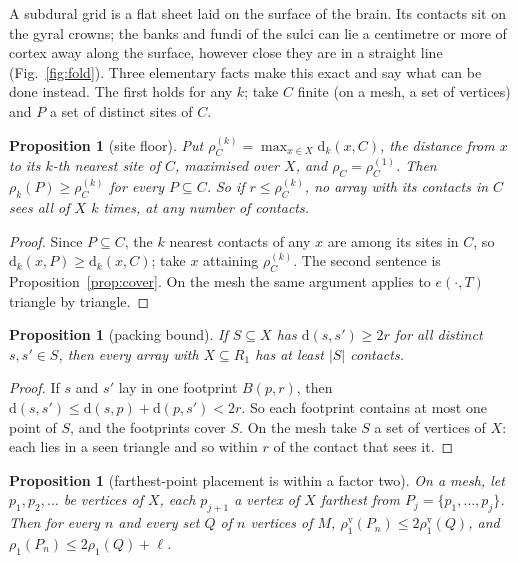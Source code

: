 \documentclass[11pt]{amsart}
\newtheorem{proposition}[theorem]{Proposition}
\theoremstyle{definition}
\theoremstyle{remark}
\newcommand{\dd}{\mathrm{d}}
\begin{document}
A subdural grid is a flat sheet laid on the surface of the brain. Its contacts
sit on the gyral crowns; the banks and fundi of the sulci can lie a centimetre
or more of cortex away along the surface, however close they are in a
straight line (Fig.~\ref{fig:fold}). Three elementary facts make this exact
and say what can be done instead. The first holds for any $k$; take $C$ finite
(on a mesh, a set of vertices) and $P$ a set of distinct sites of $C$.

\begin{proposition}[site floor]\label{prop:sitefloor}
Put $\rho_C^{(k)}=\max_{x\in X}\dd_k(x,C)$, the distance from $x$ to its $k$-th
nearest site of $C$, maximised over $X$, and $\rho_C=\rho_C^{(1)}$. Then
$\rho_k(P)\ge\rho_C^{(k)}$ for every $P\subseteq C$. So if $r\le\rho_C^{(k)}$,
no array with its contacts in $C$ sees all of $X$ $k$ times, at any number of
contacts.
\end{proposition}

\begin{proof}
Since $P\subseteq C$, the $k$ nearest contacts of any $x$ are among its sites
in $C$, so $\dd_k(x,P)\ge\dd_k(x,C)$; take $x$ attaining $\rho_C^{(k)}$. The
second sentence is Proposition~\ref{prop:cover}. On the mesh the same argument
applies to $e(\cdot,T)$ triangle by triangle.
\end{proof}

\begin{proposition}[packing bound]\label{prop:packing}
If $S\subseteq X$ has $\dd(s,s')\ge 2r$ for all distinct $s,s'\in S$, then
every array with $X\subseteq R_1$ has at least $|S|$ contacts.
\end{proposition}

\begin{proof}
If $s$ and $s'$ lay in one footprint $B(p,r)$, then $\dd(s,s')\le
\dd(s,p)+\dd(p,s')<2r$. So each footprint contains at most one point of $S$,
and the footprints cover $S$. On the mesh take $S$ a set of vertices of $X$:
each lies in a seen triangle and so within $r$ of the contact that sees it.
\end{proof}

\begin{proposition}[farthest-point placement is within a factor two]
\label{prop:greedy}
On a mesh, let $p_1,p_2,\dots$ be vertices of $X$, each $p_{j+1}$ a vertex of
$X$ farthest from $P_j=\{p_1,\dots,p_j\}$. Then for every $n$ and every set $Q$
of $n$ vertices of $M$, $\rho_1^{\mathrm{v}}(P_n)\le2\rho_1^{\mathrm{v}}(Q)$, and
$\rho_1(P_n)\le2\rho_1(Q)+\ell$.
\end{proposition}
\end{document}
